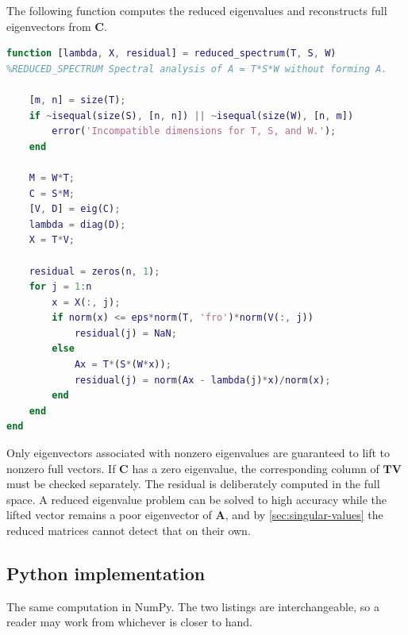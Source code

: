 \documentclass[11pt]{article}
\newcommand{\mat}[1]{\mathbf{#1}}
\theoremstyle{definition}
\theoremstyle{remark}
\begin{document}
The following function computes the reduced eigenvalues and reconstructs full eigenvectors from \(\mat{C}\).

\begin{lstlisting}[language=Matlab,caption={Reduced spectral analysis in MATLAB.},label={lst:matlab}]
function [lambda, X, residual] = reduced_spectrum(T, S, W)
%REDUCED_SPECTRUM Spectral analysis of A = T*S*W without forming A.

    [m, n] = size(T);
    if ~isequal(size(S), [n, n]) || ~isequal(size(W), [n, m])
        error('Incompatible dimensions for T, S, and W.');
    end

    M = W*T;
    C = S*M;
    [V, D] = eig(C);
    lambda = diag(D);
    X = T*V;

    residual = zeros(n, 1);
    for j = 1:n
        x = X(:, j);
        if norm(x) <= eps*norm(T, 'fro')*norm(V(:, j))
            residual(j) = NaN;
        else
            Ax = T*(S*(W*x));
            residual(j) = norm(Ax - lambda(j)*x)/norm(x);
        end
    end
end
\end{lstlisting}

Only eigenvectors associated with nonzero eigenvalues are guaranteed to lift to nonzero full vectors. If \(\mat{C}\) has a zero eigenvalue, the corresponding column of \(\mat{T}\mat{V}\) must be checked separately. The residual is deliberately computed in the full space. A reduced eigenvalue problem can be solved to high accuracy while the lifted vector remains a poor eigenvector of \(\mat{A}\), and by \cref{sec:singular-values} the reduced matrices cannot detect that on their own.

\clearpage
\subsection{Python implementation}

The same computation in NumPy. The two listings are interchangeable, so a reader may work from whichever is closer to hand.
\end{document}
